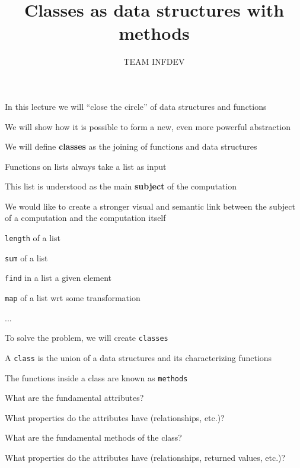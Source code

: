 \documentclass{beamer}
\title{Classes as data structures with methods}
\author{TEAM INFDEV}
\institute{Hogeschool Rotterdam \\ 
Rotterdam, Netherlands}
\date{}
\begin{document}
\maketitle

\begin{slide}{
\item In this lecture we will ``close the circle'' of data structures and functions
\item We will show how it is possible to form a new, even more powerful abstraction
\item We will define \textbf{classes} as the joining of functions and data structures
}\end{slide}

\begin{slide}{
\item Functions on lists always take a list as input
\item This list is understood as the main \textbf{subject} of the computation
\item We would like to create a stronger visual and semantic link between the subject of a computation and the computation itself
}\end{slide}

\begin{slide}{
\item \texttt{length} of a list
\item \texttt{sum} of a list
\item \texttt{find} in a list a given element
\item \texttt{map} of a list wrt some transformation
\item ...
}\end{slide}

\begin{slide}{
\item To solve the problem, we will create \texttt{classes}
\item A \texttt{class} is the union of a data structures and its characterizing functions
\item The functions inside a class are known as \texttt{methods}
}\end{slide}

\begin{slide}{
\item What are the fundamental attributes?
\item What properties do the attributes have (relationships, etc.)?
\item What are the fundamental methods of the class?
\item What properties do the attributes have (relationships, returned values, etc.)?
}\end{slide}
\end{document}
